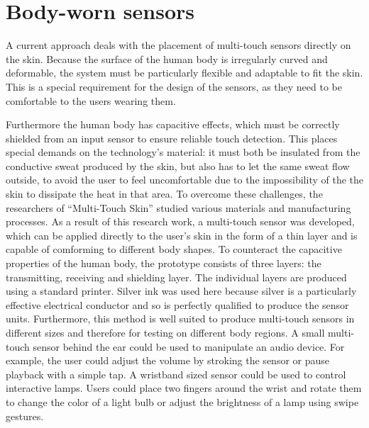 \documentclass{sigchi}
\begin{document}
\section{Body-worn sensors}
A current approach deals with the placement of multi-touch sensors directly on the skin. Because the surface of the human body is irregularly curved and deformable, the system must be particularly flexible and adaptable to fit the skin. This is a special requirement for the design of the sensors, as they need to be comfortable to the users wearing them. \cite{ulbrich2,iSkin}%

Furthermore the human body has capacitive effects, which must be correctly shielded from an input sensor to ensure reliable touch detection. This places special demands on the technology's material: it must both be insulated from the conductive sweat produced by the skin, but also has to let the same sweat flow outside, to avoid the user to feel uncomfortable due to the impossibility of the the skin to dissipate the heat in that area. \cite{ulbrich2} %
To overcome these challenges, the researchers of “Multi-Touch Skin” \cite{ulbrich2} studied various materials and manufacturing processes. As a result of this research work, a multi-touch sensor was developed, which can be applied directly to the user's skin in the form of a thin layer and is capable of comforming to different body shapes. To counteract the capacitive properties of the human body, the prototype consists of three layers: the transmitting, receiving and shielding layer. The individual layers are produced using a standard printer. Silver ink was used here because silver is a particularly effective electrical conductor and so is perfectly qualified to produce the sensor units. Furthermore, this method is well suited to produce multi-touch sensors in different sizes and therefore for testing on different body regions. \cite{ulbrich2}
A small multi-touch sensor behind the ear could be used to manipulate an audio device. For example, the user could adjust the volume by stroking the sensor or pause playback with a simple tap. A wristband sized sensor could be used to control interactive lamps. Users could place two fingers around the wrist and rotate them to change the color of a light bulb or adjust the brightness of a lamp using swipe gestures. \cite{ulbrich2}
\end{document}
